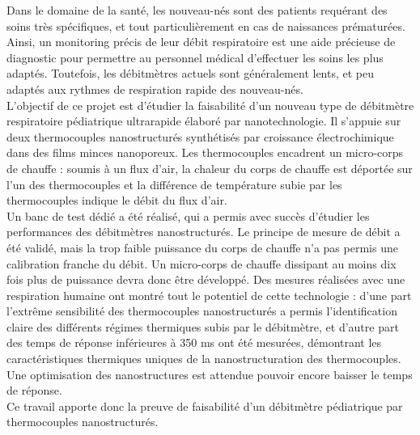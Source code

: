Dans le domaine de la santé, les nouveau-nés sont des patients requérant des soins très spécifiques, et tout particulièrement en cas de 
naissances prématurées. Ainsi, un monitoring précis de leur débit respiratoire est une aide précieuse de diagnostic pour permettre au 
personnel médical d'effectuer les soins les plus adaptés. Toutefois, les débitmètres actuels sont généralement lents, et peu adaptés aux 
rythmes de respiration rapide des nouveau-nés. \\

L'objectif de ce projet est d'étudier la faisabilité d'un nouveau type de débitmètre respiratoire pédiatrique ultrarapide élaboré par 
nanotechnologie. Il s'appuie sur deux thermocouples nanostructurés synthétisés par croissance électrochimique dans des films minces nanoporeux. 
Les thermocouples encadrent un micro-corps de chauffe : soumis à un flux d'air, la chaleur du corps de chauffe est déportée sur l'un des 
thermocouples et la différence de température subie par les thermocouples indique le débit du flux d'air.  \\

Un banc de test dédié a été réalisé, qui a permis avec succès d'étudier les performances des débitmètres nanostructurés. Le principe de mesure 
de débit a été validé, mais la trop faible puissance du corps de chauffe n'a pas permis une calibration franche du débit. Un micro-corps de 
chauffe dissipant au moins dix fois plus de puissance devra donc être développé. Des mesures réalisées avec une respiration humaine ont montré 
tout le potentiel de cette technologie : d'une part l'extrême sensibilité des thermocouples nanostructurés a permis l'identification claire 
des différents régimes thermiques subis par le débitmètre, et d'autre part des temps de réponse inférieures à 350 ms ont été mesurées, 
démontrant les caractéristiques thermiques uniques de la nanostructuration des thermocouples. Une optimisation des nanostructures est attendue 
pouvoir encore baisser le temps de réponse. \\

Ce travail apporte donc la preuve de faisabilité d'un débitmètre pédiatrique par thermocouples nanostructurés. 



